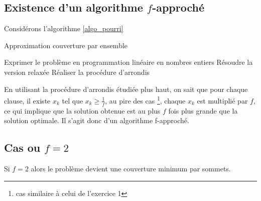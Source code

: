 \subsection{Existence d'un algorithme $f$-approché}

Considérons l'algorithme \ref{algo_pourri}
\begin{algorithm}
	\caption{Approximation couverture par ensemble}
	\label{algo_pourri}
	\begin{algorithmic}[1]
		\STATE Exprimer le problème en programmation linéaire en nombres entiers
		\STATE Résoudre la version relaxée
		\STATE Réaliser la procédure d'arrondis
	\end{algorithmic}
\end{algorithm}

En utilisant la procédure d'arrondis étudiée plus haut, on sait que pour chaque clause, il existe
$x_k$ tel que $x_k \geq \frac{1}{f}$, au pire des cas \footnote{cas similaire à celui de l'exercice
1}, chaque $x_k$ est multiplié par $f$, ce qui implique que la solution obtenue est au plus $f$ fois
plus grande que la solution optimale. Il s'agit donc d'un algorithme f-approché.

\subsection{Cas ou $f=2$}

Si $f=2$ alors le problème devient une couverture minimum par sommets.
